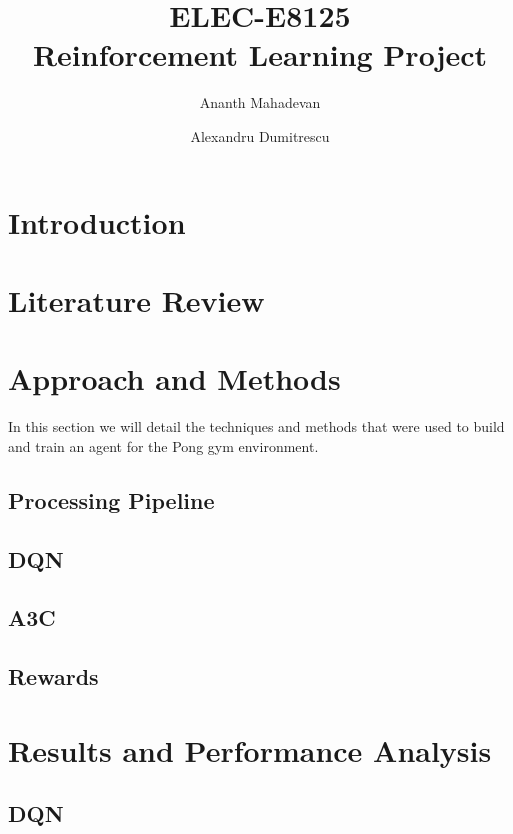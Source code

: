 \documentclass{article}
\title{ELEC-E8125 \\
        Reinforcement Learning Project}
\author{  Ananth Mahadevan\\
\and
Alexandru Dumitrescu\\
}
\date{}
\begin{document}
\maketitle
\clearpage
\tableofcontents
\clearpage

\section{Introduction}
\label{sec:introduction}



\section{Literature Review}
\label{sec:external}


\section{Approach and Methods}
\label{sec:methods}
In this section we will detail the techniques and methods that were used to build and train an agent for the Pong gym environment.

\subsection{Processing Pipeline}
\label{subsec:processing}


\subsection{DQN}
\label{sec:dqn-method}


\subsection{A3C}
\label{sec:a3c-method}


\subsection{Rewards}


\section{Results and Performance Analysis}
\label{sec:results}

\subsection{DQN}
\end{document}
